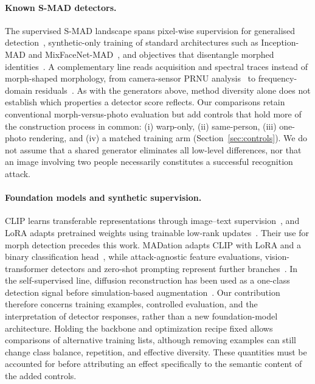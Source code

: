 \paragraph{Known S-MAD detectors.}
The supervised S-MAD landscape spans pixel-wise supervision for generalised detection~\cite{damer2021pwmad}, synthetic-only training of standard architectures such as Inception-MAD and MixFaceNet-MAD~\cite{damer2022smdd,boutros2022mixfacenet}, and objectives that disentangle morphed identities~\cite{neto2022orthomad,caldeira2023idistill}. A complementary line reads acquisition and spectral traces instead of morph-shaped morphology, from camera-sensor PRNU analysis~\cite{scherhag2019prnu} to frequency-domain residuals~\cite{paulo2026fdmad}. As with the generators above, method diversity alone does not establish which properties a detector score reflects. Our comparisons retain conventional morph-versus-photo evaluation but add controls that hold more of the construction process in common: (i) warp-only, (ii) same-person, (iii) one-photo rendering, and (iv) a matched training arm (Section~\ref{sec:controls}). We do not assume that a shared generator eliminates all low-level differences, nor that an image involving two people necessarily constitutes a successful recognition attack.

\paragraph{Foundation models and synthetic supervision.}
CLIP learns transferable representations through image--text supervision~\cite{radford2021clip}, and LoRA adapts pretrained weights using trainable low-rank updates~\cite{hu2022lora}. Their use for morph detection precedes this work. MADation adapts CLIP with LoRA and a binary classification head~\cite{caldeira2025madation}, while attack-agnostic feature evaluations, vision-transformer detectors and zero-shot prompting represent further branches~\cite{colbois2024attackagnostic,zhang2024vitsmad,caldeira2025madprompts}. In the self-supervised line, diffusion reconstruction has been used as a one-class detection signal before simulation-based augmentation~\cite{ivanovska2023madddpm}. Our contribution therefore concerns training examples, controlled evaluation, and the interpretation of detector responses, rather than a new foundation-model architecture. Holding the backbone and optimization recipe fixed allows comparisons of alternative training lists, although removing examples can still change class balance, repetition, and effective diversity. These quantities must be accounted for before attributing an effect specifically to the semantic content of the added controls.

